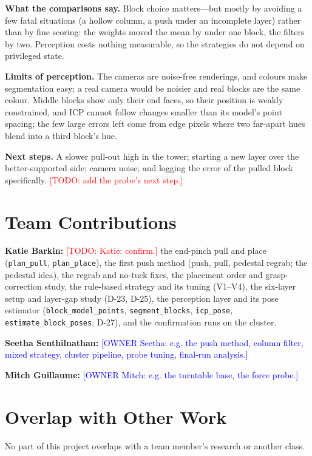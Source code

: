 \documentclass[conference]{IEEEtran}
\newcommand{\todo}[1]{\textcolor{red}{[TODO: #1]}}
\newcommand{\owner}[2]{\textcolor{blue}{[OWNER #1: #2]}}
\begin{document}
\textbf{What the comparisons say.} Block choice matters---but mostly by avoiding a few fatal situations (a hollow
column, a push under an incomplete layer) rather than by fine scoring: the weights moved the mean by under one block,
the filters by two. Perception costs nothing measurable, so the strategies do not depend on privileged state.

\textbf{Limits of perception.} The cameras are noise-free renderings, and colours make segmentation easy; a real camera
would be noisier and real blocks are the same colour. Middle blocks show only their end faces, so their position is
weakly constrained, and ICP cannot follow changes smaller than its model's point spacing; the few large errors left
come from edge pixels where two far-apart hues blend into a third block's hue.

\textbf{Next steps.} A slower pull-out high in the tower; starting a new layer over the better-supported side; camera
noise; and logging the error of the pulled block specifically. \todo{add the probe's next step.}

\section{Team Contributions}
\textbf{Katie Barkin:} \todo{Katie: confirm.} the end-pinch pull and place (\texttt{plan\_pull}, \texttt{plan\_place}),
the first push method (push, pull, pedestal regrab; the pedestal idea), the regrab and no-tuck fixes, the placement
order and grasp-correction study, the rule-based strategy and its tuning (V1--V4), the six-layer setup and layer-gap
study (D-23, D-25), the perception layer and its pose estimator (\texttt{block\_model\_points}, \texttt{segment\_blocks},
\texttt{icp\_pose}, \texttt{estimate\_block\_poses}; D-27), and the confirmation runs on the cluster.

\textbf{Seetha Senthilnathan:} \owner{Seetha}{e.g. the push method, column filter, mixed strategy, cluster
pipeline, probe tuning, final-run analysis.}

\textbf{Mitch Guillaume:} \owner{Mitch}{e.g. the turntable base, the force probe.}

\section{Overlap with Other Work}
No part of this project overlaps with a team member's research or another class.
\end{document}
